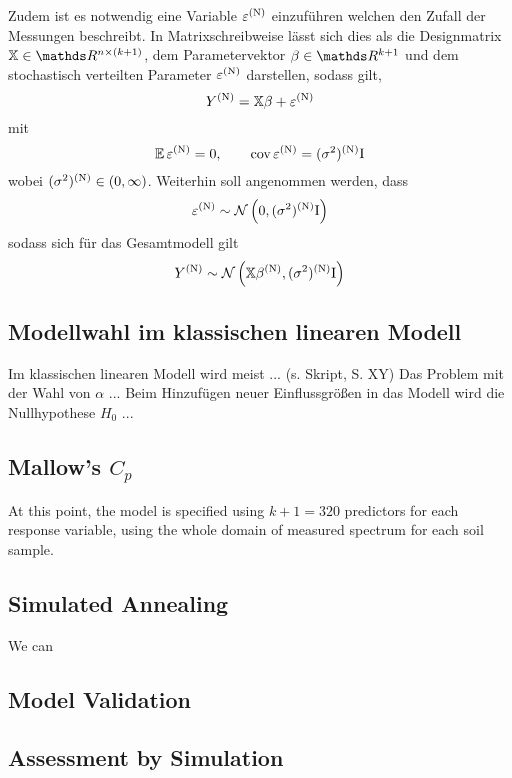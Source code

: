 		Zudem ist es notwendig eine Variable $\varepsilon^{\mathrm{(N)}}$ einzuführen welchen den Zufall der Messungen beschreibt.
	    In Matrixschreibweise lässt sich dies als die Designmatrix $\mathbb{X} \in \SR^{n \times (k+1)}$, dem Parametervektor $\beta \in \SR^{k+1}$ und dem stochastisch  verteilten Parameter $\varepsilon^{\mathrm{(N)}}$ darstellen, sodass gilt,
		\[
			Y^{\mathrm{(N)}} = \mathbb{X}\beta + \varepsilon^{\mathrm{(N)}}
		\]
		mit 
		\[
			\operatorname{\mathbb{E}} \varepsilon^{\mathrm{(N)}} = 0, \qquad \operatorname{cov} \varepsilon^{\mathrm{(N)}} = (\sigma^2)^{\mathrm{(N)}} \mathrm{I}
		\]
		wobei $(\sigma^2)^{\mathrm{(N)}} \in (0,\infty)$.
		Weiterhin soll angenommen werden, dass
	    \[
			\varepsilon^{\mathrm{(N)}} \sim \mathcal{N} \left( 0,(\sigma^2)^{\mathrm{(N)}}\mathrm{I} \right)
		\]
	    sodass sich für das Gesamtmodell gilt 
		\[
			Y^{\mathrm{(N)}} \sim \mathcal{N} \left( \mathbb{X}\beta^{\mathrm{(N)}},(\sigma^2)^{\mathrm{(N)}} \mathrm{I} \right)
		\]
	

	\subsection{Modellwahl im klassischen linearen Modell}
	\label{ssec:mlr}
	Im klassischen linearen Modell wird meist ... (s. Skript, S. XY)
	Das Problem mit der Wahl von $\alpha$ ...
	Beim Hinzufügen neuer Einflussgrößen in das Modell wird die Nullhypothese $H_0$ ...
	
		


	\subsection{Mallow's $C_{p}$}
	\label{ssec:mallows-C_p}
	
		At this point, the model is specified using $k+1 = 320$ predictors for each response variable, using the whole domain of measured spectrum for each soil sample.
		
		
	
	

	\subsection{Simulated Annealing}
	\label{ssec:model-selec}
	
		We can 

		
	\subsection{Model Validation}
	\label{ssec:model-validation}
	
	
	
	\subsection{Assessment by Simulation}
	\label{ssec:simulation}
	
		
		

